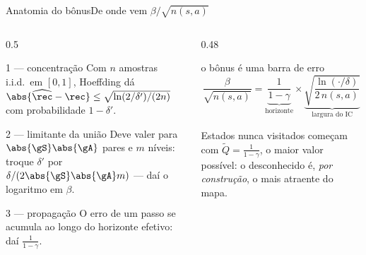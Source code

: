 \documentclass[aspectratio=169, 11pt]{beamer}
\newcommand{\Qtil}{\widetilde{Q}}
\newcommand{\Rhat}{\widehat{\rec}}
\begin{document}
\begin{frame}{Anatomia do bônus}{De onde vem $\beta/\sqrt{n(s,a)}$}
  \begin{columns}[T]
    \begin{column}{0.5\textwidth}
      \begin{teobox}{1 --- concentração}
        Com $n$ amostras i.i.d.\ em $[0,1]$, Hoeffding dá
        $\abs{\Rhat - \rec} \le \sqrt{\ln(2/\delta')/(2n)}$ com probabilidade
        $1-\delta'$.
      \end{teobox}
      \begin{teobox}{2 --- limitante da união}
        Deve valer para $\abs{\gS}\abs{\gA}$ pares e $m$ níveis: troque $\delta'$ por
        $\delta/(2\abs{\gS}\abs{\gA}m)$ --- daí o logaritmo em $\beta$.
      \end{teobox}
      \begin{teobox}{3 --- propagação}
        O erro de um passo se acumula ao longo do horizonte efetivo: daí
        $\tfrac{1}{1-\gamma}$.
      \end{teobox}
    \end{column}
    \begin{column}{0.48\textwidth}
      \begin{defbox}{o bônus é uma barra de erro}
        \[
          \frac{\beta}{\sqrt{n(s,a)}}
          =
          \underbrace{\frac{1}{1-\gamma}}_{\text{horizonte}}
          \times
          \underbrace{\sqrt{\frac{\ln(\cdot/\delta)}{2\,n(s,a)}}}_{\text{largura do IC}}
        \]
      \end{defbox}
      \begin{ideiabox}
        Estados nunca visitados começam com $\Qtil = \tfrac{1}{1-\gamma}$, o maior valor
        possível: o desconhecido é, \emph{por construção}, o mais atraente do mapa.
      \end{ideiabox}
    \end{column}
  \end{columns}
\end{frame}
\end{document}
